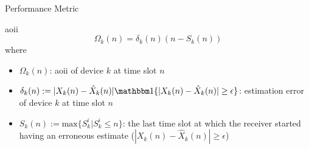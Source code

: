 \documentclass[9pt]{beamer}
\begin{document}
\begin{frame}{Performance Metric}
    \begin{block}{\gls{aoii}}
        \begin{equation}
            \Omega_k(n) = \delta_k(n) (n - S_k(n))
        \end{equation}
        where
        \begin{itemize}
            \item $\Omega_k(n)$: \gls{aoii} of device $k$ at time slot $n$
            \item $\delta_k(n) := |X_k(n) - \hat{X}_k(n)| \mathbbm1\{|X_k(n) - \hat{X}_k(n)| \ge \epsilon \}$: estimation error of device $k$ at time slot $n$
            \item $S_k(n) := \text{max} \{S_k^i | S_k^i \le n \}$: the last time slot at which the receiver started having an erroneous estimate ($|X_k(n) - \hat{X}_k(n)| \ge \epsilon$)
        \end{itemize}
    \end{block}
\end{frame}

%
\end{document}

